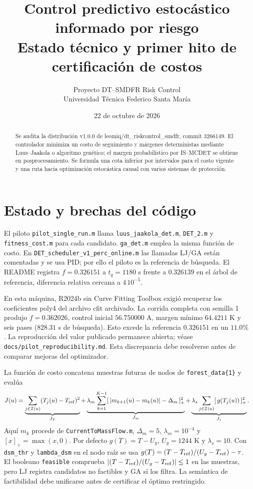 \documentclass[11pt,a4paper]{article}
\title{\textcolor{usmblue}{Control predictivo estocástico informado por riesgo}\\
\large Estado técnico y primer hito de certificación de costos}
\author{Proyecto DT--SMDFR Risk Control\\Universidad Técnica Federico Santa María}
\date{22 de octubre de 2026}
\begin{document}
\maketitle
\begin{abstract}
Se audita la distribución v1.0.0 de leomiq/dt\_riskcontrol\_smdfr,
commit 3266149. El controlador minimiza un costo de seguimiento y márgenes
deterministas mediante Luus--Jaakola o algoritmo genético; el margen
probabilístico por IS--MCDET se obtiene en posprocesamiento. Se formula
una cota inferior por intervalos para el costo vigente y una ruta hacia
optimización estocástica causal con varios sistemas de protección.
\end{abstract}

\section{Estado y brechas del código}
El piloto \texttt{pilot\_single\_run.m} llama
\texttt{luus\_jaakola\_det.m}, \texttt{DET\_2.m} y
\texttt{fitness\_cost.m} para cada candidato. \texttt{ga\_det.m}
emplea la misma función de costo. En
\nolinkurl{DET_scheduler_v1_perc_online.m} las llamadas LJ/GA están
comentadas y se usa PID; por ello el piloto es la referencia de búsqueda.
El README registra $f=0.326151$ a $t_q=1180$ s frente a $0.326139$
en el árbol de referencia, diferencia relativa cercana a $4\,10^{-5}$.

En esta máquina, R2024b sin Curve Fitting Toolbox exigió recuperar
los coeficientes poly4 del archivo cfit archivado. La corrida completa
con semilla 1 produjo $f=0.362026$, control inicial $56.750000$ A,
margen mínimo $64.4211$ K y seis pases ($828.31$ s de búsqueda).
Esto excede la referencia $0.326151$ en un $11.0\%$.
La reproducción del valor publicado permanece abierta; véase
\texttt{docs/pilot\_reproducibility.md}. Esta discrepancia debe
resolverse antes de comparar mejoras del optimizador.

La función de costo concatena muestras futuras de nodos de
\texttt{forest\_data\{1\}} y evalúa
\begin{equation}
J(u)=
\underbrace{\sum_{j\in\mathcal I(u)}(T_j(u)-T_{\rm ref})^2}_{J_T}
+\underbrace{\lambda_m\sum_{k=1}^{K-1}
 [\,|m_{k+1}(u)-m_k(u)|-\Delta_m\,]_+^2}_{J_m}
+\underbrace{\lambda_s\sum_{j\in\mathcal I(u)}
 [\,g(T_j(u))\,]_+^2}_{J_s}.
\label{eq:old}
\end{equation}
Aquí $m_k$ procede de \texttt{CurrentToMassFlow.m},
$\Delta_m=5$, $\lambda_m=10^{-4}$ y $[x]_+=\max(x,0)$.
Por defecto $g(T)=T-U_y$, $U_y=1244$ K y $\lambda_s=10$.
Con \texttt{dsm\_thr} y \texttt{lambda\_dsm} en el nodo raíz se usa
$g(T)=(T-T_{\rm ref})/(U_y-T_{\rm ref})-\tau$.
El booleano \texttt{feasible} comprueba
$|(T-T_{\rm ref})/(U_y-T_{\rm ref})|\leq1$ en las muestras,
pero LJ registra candidatos no factibles y GA sí los filtra.
La semántica de factibilidad debe unificarse antes de certificar el
óptimo restringido.
\end{document}
